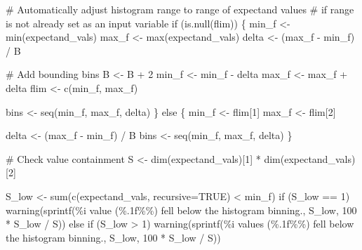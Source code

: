 \documentclass[
  letterpaper,
  DIV=11,
  numbers=noendperiod]{scrartcl}
\newenvironment{Shaded}{\begin{snugshade}}{\end{snugshade}}
\newcommand{\BuiltInTok}[1]{\textcolor[rgb]{0.00,0.23,0.31}{#1}}
\newcommand{\CommentTok}[1]{\textcolor[rgb]{0.37,0.37,0.37}{#1}}
\newcommand{\ControlFlowTok}[1]{\textcolor[rgb]{0.00,0.23,0.31}{#1}}
\newcommand{\DecValTok}[1]{\textcolor[rgb]{0.68,0.00,0.00}{#1}}
\newcommand{\KeywordTok}[1]{\textcolor[rgb]{0.00,0.23,0.31}{#1}}
\newcommand{\NormalTok}[1]{\textcolor[rgb]{0.00,0.23,0.31}{#1}}
\newcommand{\OperatorTok}[1]{\textcolor[rgb]{0.37,0.37,0.37}{#1}}
\newcommand{\SpecialCharTok}[1]{\textcolor[rgb]{0.37,0.37,0.37}{#1}}
\newcommand{\StringTok}[1]{\textcolor[rgb]{0.13,0.47,0.30}{#1}}
\begin{document}
\begin{Shaded}
\begin{Highlighting}[]
  \CommentTok{\# Automatically adjust histogram range to range of expectand values}
  \CommentTok{\# if range is not already set as an input variable}
  \ControlFlowTok{if}\NormalTok{ (}\KeywordTok{is}\NormalTok{.null(flim)) \{}
\NormalTok{    min\_f }\OperatorTok{\textless{}{-}} \BuiltInTok{min}\NormalTok{(expectand\_vals)}
\NormalTok{    max\_f }\OperatorTok{\textless{}{-}} \BuiltInTok{max}\NormalTok{(expectand\_vals)}
\NormalTok{    delta }\OperatorTok{\textless{}{-}}\NormalTok{ (max\_f }\OperatorTok{{-}}\NormalTok{ min\_f) }\OperatorTok{/}\NormalTok{ B}

    \CommentTok{\# Add bounding bins}
\NormalTok{    B }\OperatorTok{\textless{}{-}}\NormalTok{ B }\OperatorTok{+} \DecValTok{2}
\NormalTok{    min\_f }\OperatorTok{\textless{}{-}}\NormalTok{ min\_f }\OperatorTok{{-}}\NormalTok{ delta}
\NormalTok{    max\_f }\OperatorTok{\textless{}{-}}\NormalTok{ max\_f }\OperatorTok{+}\NormalTok{ delta}
\NormalTok{    flim }\OperatorTok{\textless{}{-}}\NormalTok{ c(min\_f, max\_f)}

\NormalTok{    bins }\OperatorTok{\textless{}{-}}\NormalTok{ seq(min\_f, max\_f, delta)}
\NormalTok{  \} }\ControlFlowTok{else}\NormalTok{ \{}
\NormalTok{    min\_f }\OperatorTok{\textless{}{-}}\NormalTok{ flim[}\DecValTok{1}\NormalTok{]}
\NormalTok{    max\_f }\OperatorTok{\textless{}{-}}\NormalTok{ flim[}\DecValTok{2}\NormalTok{]}

\NormalTok{    delta }\OperatorTok{\textless{}{-}}\NormalTok{ (max\_f }\OperatorTok{{-}}\NormalTok{ min\_f) }\OperatorTok{/}\NormalTok{ B}
\NormalTok{    bins }\OperatorTok{\textless{}{-}}\NormalTok{ seq(min\_f, max\_f, delta)}
\NormalTok{  \}}

  \CommentTok{\# Check value containment}
\NormalTok{  S }\OperatorTok{\textless{}{-}}\NormalTok{ dim(expectand\_vals)[}\DecValTok{1}\NormalTok{] }\OperatorTok{*}\NormalTok{ dim(expectand\_vals)[}\DecValTok{2}\NormalTok{]}

\NormalTok{  S\_low }\OperatorTok{\textless{}{-}} \BuiltInTok{sum}\NormalTok{(c(expectand\_vals, recursive}\OperatorTok{=}\NormalTok{TRUE) }\OperatorTok{\textless{}}\NormalTok{ min\_f)}
  \ControlFlowTok{if}\NormalTok{ (S\_low }\OperatorTok{==} \DecValTok{1}\NormalTok{)}
\NormalTok{    warning(sprintf(}\StringTok{\textquotesingle{}}\SpecialCharTok{\%i}\StringTok{ value (}\SpecialCharTok{\%.1f\%\%}\StringTok{) fell below the histogram binning.\textquotesingle{}}\NormalTok{,}
\NormalTok{                    S\_low, }\DecValTok{100} \OperatorTok{*}\NormalTok{ S\_low }\OperatorTok{/}\NormalTok{ S))}
  \ControlFlowTok{else} \ControlFlowTok{if}\NormalTok{ (S\_low }\OperatorTok{\textgreater{}} \DecValTok{1}\NormalTok{)}
\NormalTok{    warning(sprintf(}\StringTok{\textquotesingle{}}\SpecialCharTok{\%i}\StringTok{ values (}\SpecialCharTok{\%.1f\%\%}\StringTok{) fell below the histogram binning.\textquotesingle{}}\NormalTok{,}
\NormalTok{                    S\_low, }\DecValTok{100} \OperatorTok{*}\NormalTok{ S\_low }\OperatorTok{/}\NormalTok{ S))}


\end{Highlighting}
\end{Shaded}
\end{document}
